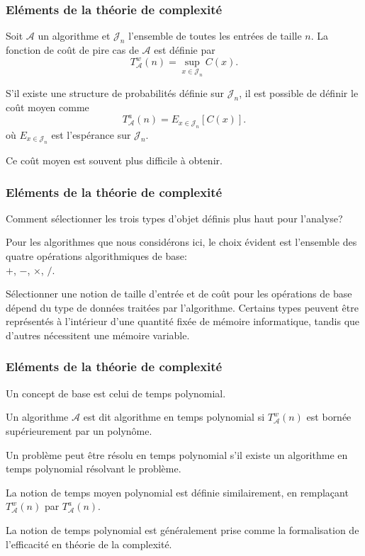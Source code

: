 \documentclass[t, aspectratio=169,usepdftitle=false]{beamer}
\begin{document}
\begin{frame}
\frametitle{Eléments de la théorie de complexité}

Soit $\mathcal{A}$ un algorithme et $\mathcal{J}_n$ l'ensemble de toutes les entrées de taille $n$. La fonction de coût de pire cas de $\mathcal{A}$ est définie par
\[
T^w_{\mathcal{A}}(n) = \sup_{x \in \mathcal{J}_n} C(x).
\]

\mbox{}

S'il existe une structure de probabilités définie sur $\mathcal{J}_n$, il est possible de définir le coût moyen comme
\[
T^a_{\mathcal{A}}(n) = E_{x \in \mathcal{J}_n} [C(x)].
\]
où $E_{x \in \mathcal{J}_n}$ est l'espérance sur $\mathcal{J}_n$.

\mbox{}

Ce coût moyen est souvent plus difficile à obtenir.

\end{frame}

\begin{frame}
\frametitle{Eléments de la théorie de complexité}

Comment sélectionner les trois types d'objet définis plus haut pour l'analyse?

\mbox{}

Pour les algorithmes que nous considérons ici, le choix évident est l'ensemble des quatre opérations algorithmiques de base:\\
$+$, $-$, $\times$, $/$.

\mbox{}

Sélectionner une notion de taille d'entrée et de coût pour les opérations de base dépend du type de données traitées par l'algorithme. Certains types peuvent être représentés à l'intérieur d'une quantité fixée de mémoire informatique, tandis que d'autres nécessitent une mémoire variable.

\end{frame}

\begin{frame}
\frametitle{Eléments de la théorie de complexité}

Un concept de base est celui de temps polynomial.

\mbox{}

Un algorithme $\mathcal{A}$ est dit algorithme en temps polynomial si $T_{\mathcal{A}}^w(n)$ est bornée supérieurement par un polynôme.

\mbox{}

Un problème peut être résolu en temps polynomial s'il existe un algorithme en temps polynomial résolvant le problème.

\mbox{}

La notion de temps moyen polynomial est définie similairement, en remplaçant $T_{\mathcal{A}}^w(n)$ par $T_{\mathcal{A}}^a(n)$.

\mbox{}

La notion de temps polynomial est généralement prise comme la formalisation de l'efficacité en théorie de la complexité.

\end{frame}
\end{document}
